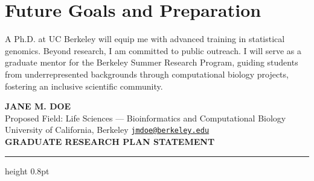 \section{Future Goals and Preparation}
A Ph.D. at UC Berkeley will equip me with advanced training in statistical genomics. Beyond research, I am committed to public outreach. I will serve as a graduate mentor for the Berkeley Summer Research Program, guiding students from underrepresented backgrounds through computational biology projects, fostering an inclusive scientific community.

\newpage


\begin{center}
    {\fontsize{12pt}{14pt}\selectfont \textbf{\textcolor{accent}{JANE M. DOE}}} \\
    \vspace{2pt}
    {\fontsize{9.5pt}{11pt}\selectfont Proposed Field: Life Sciences --- Bioinformatics and Computational Biology} \\
    {\fontsize{9.5pt}{11pt}\selectfont University of California, Berkeley \quad \textbullet \quad \href{mailto:jmdoe@berkeley.edu}{\texttt{jmdoe@berkeley.edu}}} \\
    \vspace{4pt}
    {\fontsize{10.5pt}{12pt}\selectfont \textbf{GRADUATE RESEARCH PLAN STATEMENT}}
\end{center}
\vspace{-8pt}
\textcolor{accent}{\hrule height 0.8pt}
\vspace{6pt}
